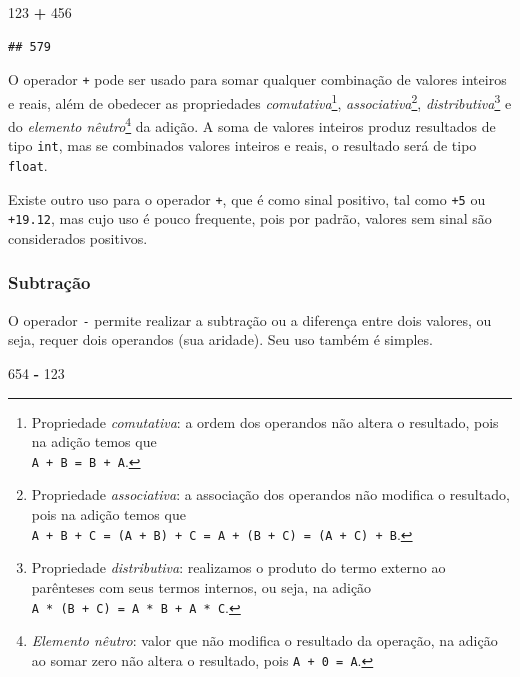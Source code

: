 \documentclass[
]{book}
\newenvironment{Shaded}{\begin{snugshade}}{\end{snugshade}}
\newcommand{\DecValTok}[1]{\textcolor[rgb]{0.00,0.00,0.81}{#1}}
\newcommand{\OperatorTok}[1]{\textcolor[rgb]{0.81,0.36,0.00}{\textbf{#1}}}
\begin{document}
\begin{Shaded}
\begin{Highlighting}[]
\DecValTok{123} \OperatorTok{+} \DecValTok{456}
\end{Highlighting}
\end{Shaded}

\begin{verbatim}
## 579
\end{verbatim}

O operador \texttt{+} pode ser usado para somar qualquer combinação de valores inteiros e reais, além de obedecer as propriedades \emph{comutativa}\footnote{Propriedade \emph{comutativa}: a ordem dos operandos não altera o resultado, pois na adição temos que\\
  \texttt{A\ +\ B\ =\ B\ +\ A}.}, \emph{associativa}\footnote{Propriedade \emph{associativa}: a associação dos operandos não modifica o resultado, pois na adição temos que\\
  \texttt{A\ +\ B\ +\ C\ =\ (A\ +\ B)\ +\ C\ =\ A\ +\ (B\ +\ C)\ =\ (A\ +\ C)\ +\ B}.}, \emph{distributiva}\footnote{Propriedade \emph{distributiva}: realizamos o produto do termo externo ao parênteses com seus termos internos, ou seja, na adição \texttt{A\ *\ (B\ +\ C)\ =\ A\ *\ B\ +\ A\ *\ C}.} e do \emph{elemento nêutro}\footnote{\emph{Elemento nêutro}: valor que não modifica o resultado da operação, na adição ao somar zero não altera o resultado, pois \texttt{A\ +\ 0\ =\ A}.} da adição. A soma de valores inteiros produz resultados de tipo \texttt{int}, mas se combinados valores inteiros e reais, o resultado será de tipo \texttt{float}.

Existe outro uso para o operador \texttt{+}, que é como sinal positivo, tal como \texttt{+5} ou \texttt{+19.12}, mas cujo uso é pouco frequente, pois por padrão, valores sem sinal são considerados positivos.

\hypertarget{subtrauxe7uxe3o}{%
\subsubsection{Subtração}\label{subtrauxe7uxe3o}}

O operador \texttt{-} permite realizar a subtração ou a diferença entre dois valores, ou seja, requer dois operandos (sua aridade). Seu uso também é simples.

\begin{Shaded}
\begin{Highlighting}[]
\DecValTok{654} \OperatorTok{{-}} \DecValTok{123}
\end{Highlighting}
\end{Shaded}
\end{document}
